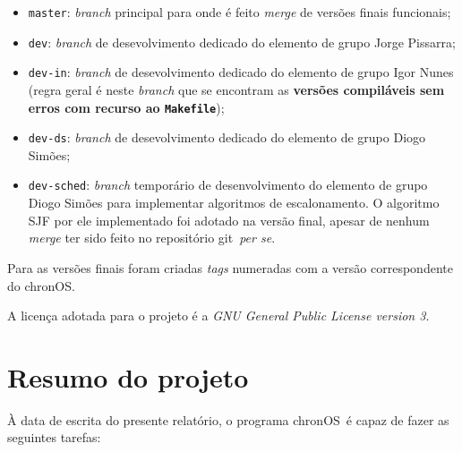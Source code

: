 \documentclass[10pt,oneside]{estiloUBI}
\newcommand{\chronOS}{\textsf{chronOS}}
\newcommand{\git}{\textsf{git}}
\begin{document}
	\begin{itemize}
		\item \texttt{master}: \textit{branch} principal para onde é feito \textit{merge} de versões finais funcionais;
		
		\item \texttt{dev}: \textit{branch} de desevolvimento dedicado do elemento de grupo Jorge Pissarra;
		
		\item \texttt{dev-in}: \textit{branch} de desevolvimento dedicado do elemento de grupo Igor Nunes (regra geral é neste \textit{branch} que se encontram as \textbf{versões compiláveis sem erros com recurso ao \texttt{Makefile}});
		
		\item \texttt{dev-ds}: \textit{branch} de desevolvimento dedicado do elemento de grupo Diogo Simões;
		
		\item \texttt{dev-sched}: \textit{branch} temporário de desenvolvimento do elemento de grupo Diogo Simões para implementar algoritmos de escalonamento. O algoritmo \ac{SJF} por ele implementado foi adotado na versão final, apesar de nenhum \textit{merge} ter sido feito no repositório \git~\textit{per se}.
	\end{itemize}

	Para as versões finais foram criadas \textit{tags} numeradas com a versão correspondente do \chronOS.
	
	A licença adotada para o projeto é a \textit{GNU General Public License version 3}.
	

	\section{Resumo do projeto}
	\label{ssec:dev:summary}
	
	À data de escrita do presente relatório, o programa \chronOS~é capaz de fazer as seguintes tarefas:
	
\end{document}
